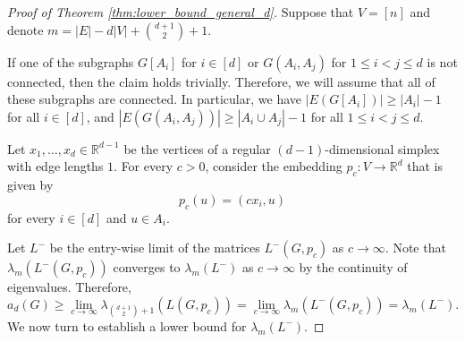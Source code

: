 \documentclass[a4paper,11pt]{article}
\theoremstyle{plain}
\theoremstyle{definition}
\newcommand{\Rea}{{\mathbb R}}
\begin{document}
\begin{proof}[Proof of Theorem \ref{thm:lower_bound_general_d}]
Suppose that $V=[n]$ and denote $m=|E|-d|V|+\binom{d+1}{2}+1$.

If one of the subgraphs $G[A_i]$ for $i\in[d]$ or $G(A_i,A_j)$ for $1\leq i<j\leq d$ is not connected, then the claim holds trivially. Therefore, we will assume that all of these subgraphs are connected. In particular, we have $|E(G[A_i])|\geq |A_i|-1$ for all $i\in[d]$, and $|E(G(A_i,A_j))|\geq |A_i\cup A_j|-1$ for all $1\leq i<j\leq d$. 


Let $x_1,\ldots,x_d\in \Rea^{d-1}$ be the vertices of a regular $(d-1)$-dimensional simplex with edge lengths $1$.
For every $c>0$, consider the embedding $p_c: V\to \Rea^d$ that is given by
\[
    p_c(u)=\left(c x_{i},u \right)
\]
for every $i\in[d]$ and $u\in A_i$. 

Let $L^-$ be the entry-wise limit of the matrices $L^{-}(G,p_c)$ as $c\to\infty$. Note that $\lambda_m(L^-(G,p_c))$ converges to $\lambda_{m}(L^{-})$ as $c\to\infty$ by the continuity of eigenvalues. Therefore,
\begin{equation}
\label{eqn:a_d_and_L_minus}
a_d(G) \ge \lim_{c\to\infty}\lambda_{\binom{d+1}{2}+1}(L(G,p_c))
= \lim_{c\to\infty}\lambda_{m}(L^-(G,p_c))
= \lambda_{m}(L^-).
\end{equation}
We now turn to establish a lower bound for $\lambda_{m}(L^-).$



\end{proof}
\end{document}
